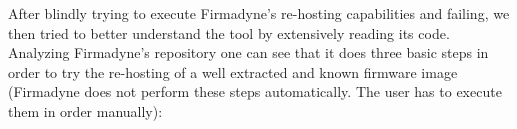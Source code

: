 \begin{table}[H]
\centering
\caption{First results when experimenting with Re-hosting via Firmadyne. Firmware images selected at random. Minimal Firmadyne automation involved.}
\label{tab:fist-rehosting}
\end{table}

After blindly trying to execute Firmadyne's re-hosting capabilities and failing, we then tried to better understand the tool by extensively reading its code.  Analyzing Firmadyne's repository one can see that it does three basic steps in order to try the re-hosting of a well extracted and known firmware image (Firmadyne does not perform these steps automatically. The user has to execute them in order manually):

